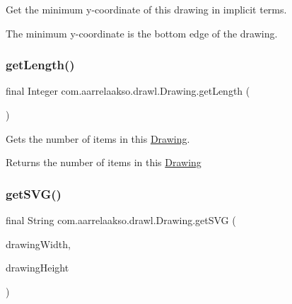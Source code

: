 Get the minimum y-\/coordinate of this drawing in implicit terms. 

The minimum y-\/coordinate is the bottom edge of the drawing. \mbox{\label{classcom_1_1aarrelaakso_1_1drawl_1_1_drawing_a3977c6a791f29d87eaad10771ed8eb80}} 
\subsubsection{\texorpdfstring{get\+Length()}{getLength()}}
{\footnotesize\ttfamily final Integer com.\+aarrelaakso.\+drawl.\+Drawing.\+get\+Length (\begin{DoxyParamCaption}{ }\end{DoxyParamCaption})}



Gets the number of items in this \hyperlink{classcom_1_1aarrelaakso_1_1drawl_1_1_drawing}{Drawing}. 

\begin{DoxyReturn}{Returns}
the number of items in this \hyperlink{classcom_1_1aarrelaakso_1_1drawl_1_1_drawing}{Drawing} 
\end{DoxyReturn}
\mbox{\label{classcom_1_1aarrelaakso_1_1drawl_1_1_drawing_ac005562185c059c5cd14a1df92b335d6}} 
\subsubsection{\texorpdfstring{get\+S\+V\+G()}{getSVG()}\hspace{0.1cm}{\footnotesize\ttfamily [1/2]}}
{\footnotesize\ttfamily final String com.\+aarrelaakso.\+drawl.\+Drawing.\+get\+S\+VG (\begin{DoxyParamCaption}\item[{@Not\+Null final Integer}]{drawing\+Width,  }\item[{@Not\+Null final Integer}]{drawing\+Height }\end{DoxyParamCaption})}



